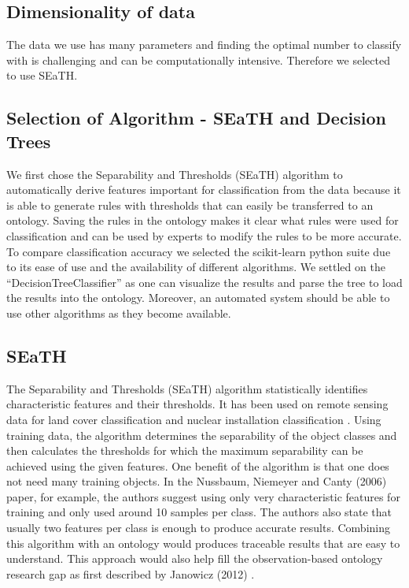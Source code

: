 \documentclass[a4paper,12pt]{article}
\begin{document}
\subsection{Dimensionality of data}
The data we use has many parameters and finding the optimal number to classify
with is challenging and can be computationally intensive. Therefore we selected
to use SEaTH.

\subsection{Selection of Algorithm - SEaTH and Decision Trees}
We first chose the Separability and Thresholds
(SEaTH) \cite{Nussbaum2006} algorithm to automatically derive features important
for classification from the data because it is able to generate rules with
thresholds that can easily be transferred to an ontology. Saving the rules in
the ontology makes it clear what rules were used for classification and can be
used by experts to modify the rules to be more accurate. To compare
classification accuracy we selected the scikit-learn python suite
\cite{scikit-learn} due to its ease of use and the availability of
different algorithms. We settled on the ``DecisionTreeClassifier'' as one can
visualize the results and parse the tree to load the results into the ontology.
Moreover, an automated system should be able to use other algorithms as they become available.

\subsection{SEaTH} The Separability and Thresholds (SEaTH) algorithm
\cite{Nussbaum2006} statistically identifies characteristic features and their thresholds. It has
been used on remote sensing data for land cover classification \cite{Gao2011}
and nuclear installation classification \cite{Nussbaum2006}.
Using training data, the algorithm determines the separability of the object
classes and then calculates the thresholds for which the maximum separability
can be achieved using the given features. One benefit of the algorithm is that
one does not need many training objects.
In the Nussbaum, Niemeyer and Canty (2006) paper, for example, the authors
suggest using only very characteristic features for training and only used
around 10 samples per class\cite{Nussbaum2006}. The authors also state that
usually two features per class is enough to produce accurate results. Combining
this algorithm with an ontology would produces traceable results that are easy
to understand. This approach would also help fill the observation-based ontology
research gap as first described by Janowicz (2012) \cite{Janowicz2012}.
\end{document}
